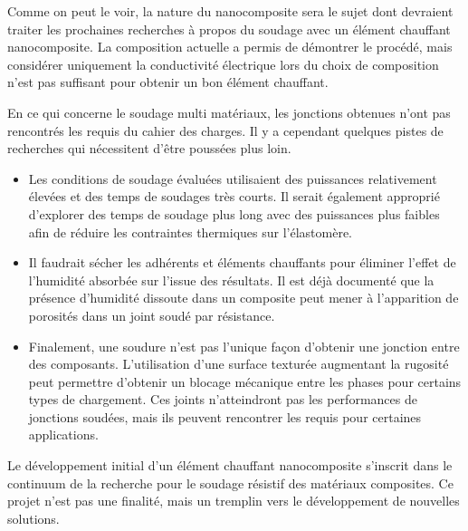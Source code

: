 Comme on peut le voir, la nature du nanocomposite sera le sujet dont devraient traiter les prochaines recherches à propos du soudage avec un élément chauffant nanocomposite. 
La composition actuelle a permis de démontrer le procédé, mais considérer uniquement la conductivité électrique lors du choix de composition n'est pas suffisant pour obtenir un bon élément chauffant.

En ce qui concerne le soudage multi matériaux, les jonctions obtenues n'ont pas rencontrés les requis du cahier des charges. 
Il y a cependant quelques pistes de recherches qui nécessitent d'être poussées plus loin. 

\begin{itemize}
	\item Les conditions de soudage évaluées utilisaient des puissances relativement élevées et des temps de soudages très courts. 
	Il serait également approprié d'explorer des temps de soudage plus long avec des puissances plus faibles afin de réduire les contraintes thermiques sur l'élastomère. 
	\item Il faudrait sécher les adhérents et éléments chauffants pour éliminer l'effet de l'humidité absorbée sur l'issue des résultats. 
	Il est déjà documenté que la présence d'humidité dissoute dans un composite peut mener à l'apparition de porosités dans un joint soudé par résistance. 
	\item Finalement, une soudure n'est pas l'unique façon d'obtenir une jonction entre des composants. 
	L'utilisation d'une surface texturée augmentant la rugosité peut permettre d'obtenir un blocage mécanique entre les phases pour certains types de chargement. 
	Ces joints n'atteindront pas les performances de jonctions soudées, mais ils peuvent rencontrer les requis pour certaines applications. 
\end{itemize}

Le développement initial d'un élément chauffant nanocomposite s'inscrit dans le continuum de la recherche pour le soudage résistif des matériaux composites. 
Ce projet n'est pas une finalité, mais un tremplin vers le développement de nouvelles solutions. 